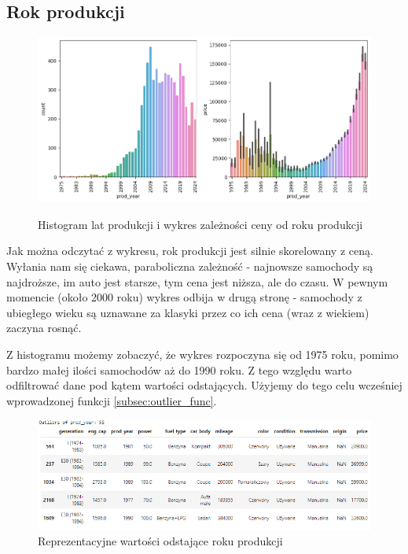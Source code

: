 \documentclass{article}
\begin{document}
\subsection{Rok produkcji}
\begin{figure}[H]
    \centering
    \includegraphics[width=1\linewidth]{images/rok_produkcji_przed.png}
    \label{plt:prod_year_bef}
    \caption{Histogram lat produkcji i wykres zależności ceny od roku produkcji}
\end{figure}

Jak można odczytać z wykresu, rok produkcji jest silnie skorelowany z ceną. Wyłania nam się ciekawa, paraboliczna zależność - najnowsze samochody są najdroższe, im auto jest starsze, tym cena jest niższa, ale do czasu. W pewnym momencie (około 2000 roku) wykres odbija w drugą stronę - samochody z ubiegłego wieku są uznawane za klasyki przez co ich cena (wraz z wiekiem) zaczyna rosnąć.

Z histogramu możemy zobaczyć, że wykres rozpoczyna się od 1975 roku, pomimo bardzo małej ilości samochodów aż do 1990 roku. Z tego względu warto odfiltrować dane pod kątem wartości odstających. Użyjemy do tego celu wcześniej wprowadzonej funkcji \ref{subsec:outlier_func}.
\begin{figure}[H]
    \centering
    \includegraphics[width=0.9\linewidth]{images/reprezentacyjne_wartosci_odstajace_roku_produkcji.png}
    \caption{Reprezentacyjne wartości odstające roku produkcji}
\end{figure}
\end{document}
